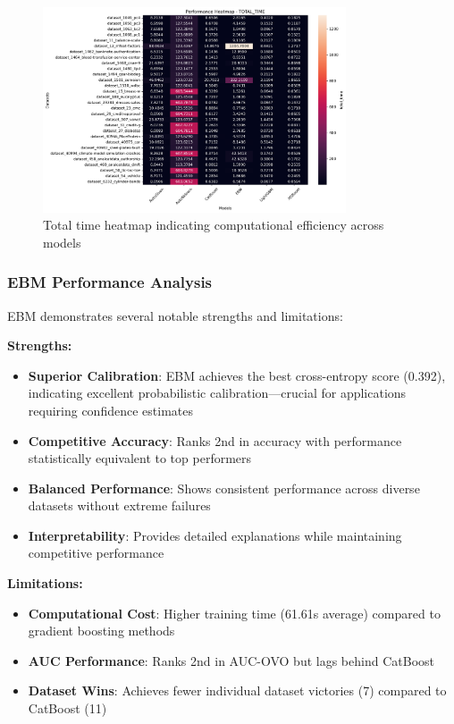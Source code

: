 \documentclass[12pt]{article}
\begin{document}
\begin{figure}[ht]
\centering
\includegraphics[width=0.8\textwidth]{stat_results/heatmap_total_time.png}
\caption{Total time heatmap indicating computational efficiency across models}
\label{fig:total_time_heatmap}
\end{figure}


\subsubsection{EBM Performance Analysis}

EBM demonstrates several notable strengths and limitations:

\textbf{Strengths:}
\begin{itemize}
\item \textbf{Superior Calibration}: EBM achieves the best cross-entropy score (0.392), indicating excellent probabilistic calibration—crucial for applications requiring confidence estimates
\item \textbf{Competitive Accuracy}: Ranks 2nd in accuracy with performance statistically equivalent to top performers
\item \textbf{Balanced Performance}: Shows consistent performance across diverse datasets without extreme failures
\item \textbf{Interpretability}: Provides detailed explanations while maintaining competitive performance
\end{itemize}

\textbf{Limitations:}
\begin{itemize}
\item \textbf{Computational Cost}: Higher training time (61.61s average) compared to gradient boosting methods
\item \textbf{AUC Performance}: Ranks 2nd in AUC-OVO but lags behind CatBoost
\item \textbf{Dataset Wins}: Achieves fewer individual dataset victories (7) compared to CatBoost (11)
\end{itemize}
\end{document}
